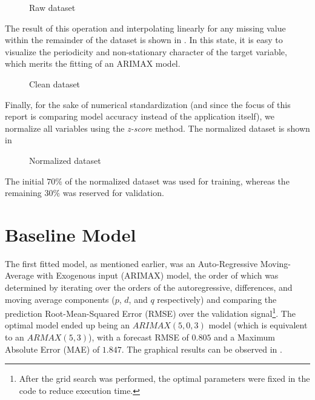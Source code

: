 \documentclass{scrartcl}
\begin{document}
  \begin{figure}[ht]
    \centering
    
    \caption{Raw dataset}
    \label{fig:timeseries_raw}
  \end{figure}

  The result of this operation and interpolating linearly for any missing value within the remainder of the dataset is shown in . In this state, it is easy to visualize the periodicity and non-stationary character of the target variable, which merits the fitting of an ARIMAX model.

  \begin{figure}[ht]
    \centering
    
    \caption{Clean dataset}
    \label{fig:timeseries_clean}
  \end{figure}

  Finally, for the sake of numerical standardization (and since the focus of this report is comparing model accuracy instead of the application itself), we normalize all variables using the \emph{z-score} method. The normalized dataset is shown in 

  \begin{figure}[ht]
    \centering
    
    \caption{Normalized dataset}
    \label{fig:timeseries_norm}
  \end{figure}

  The initial $70\%$ of the normalized dataset was used for training, whereas the remaining $30\%$ was reserved for validation.

\section{Baseline Model}

  The first fitted model, as mentioned earlier, was an Auto-Regressive Moving-Average with Exogenous input (ARIMAX) model, the order of which was determined by iterating over the orders of the autoregressive, differences, and moving average components ($p$, $d$, and $q$ respectively) and comparing the prediction Root-Mean-Squared Error (RMSE) over the validation signal\footnote{After the grid search was performed, the optimal parameters were fixed in the code to reduce execution time.}. The optimal model ended up being an $ARIMAX(5,0,3)$ model (which is equivalent to an $ARMAX(5,3)$), with a forecast RMSE of $0.805$ and a Maximum Absolute Error (MAE) of $1.847$. The graphical results can be observed in .
\end{document}
